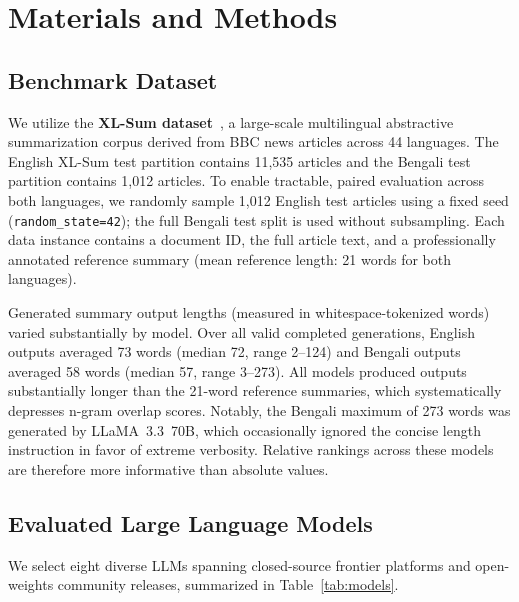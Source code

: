 \documentclass[runningheads]{llncs}
\begin{document}
%
%
\section{Materials and Methods}\label{sec:methods}

\subsection{Benchmark Dataset}\label{subsec:dataset}

We utilize the \textbf{XL-Sum dataset}~\cite{hasan2021}, a large-scale multilingual abstractive summarization corpus derived from BBC news articles across 44 languages. The English XL-Sum test partition contains 11,535 articles and the Bengali test partition contains 1,012 articles. To enable tractable, paired evaluation across both languages, we randomly sample 1,012 English test articles using a fixed seed (\texttt{random\_state=42}); the full Bengali test split is used without subsampling. Each data instance contains a document ID, the full article text, and a professionally annotated reference summary (mean reference length: 21 words for both languages).

Generated summary output lengths (measured in whitespace-tokenized words) varied substantially by model. Over all valid completed generations, English outputs averaged 73 words (median 72, range 2--124) and Bengali outputs averaged 58 words (median 57, range 3--273). All models produced outputs substantially longer than the 21-word reference summaries, which systematically depresses n-gram overlap scores. Notably, the Bengali maximum of 273 words was generated by LLaMA~3.3~70B, which occasionally ignored the concise length instruction in favor of extreme verbosity. Relative rankings across these models are therefore more informative than absolute values.

\subsection{Evaluated Large Language Models}\label{subsec:models}

We select eight diverse LLMs spanning closed-source frontier platforms and open-weights community releases, summarized in Table~\ref{tab:models}.
\end{document}
